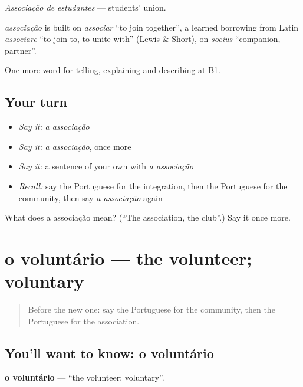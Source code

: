 \emph{Associação de estudantes} — students' union.

\begin{cousinweb}
\emph{associação} is built on \emph{associar} \textquotedblleft{}to join together\textquotedblright{}, a learned borrowing from Latin \emph{associāre} \textquotedblleft{}to join to, to unite with\textquotedblright{} (Lewis \& Short), on \emph{socius} \textquotedblleft{}companion, partner\textquotedblright{}.
\end{cousinweb}

\begin{grammarlens}[title={What you've built}]
One more word for telling, explaining and describing at B1.
\end{grammarlens}

\subsection*{Your turn}
\begin{itemize}
\raggedright
  \item \emph{Say it:} \emph{a associação}
  \item \emph{Say it:} \emph{a associação}, once more
  \item \emph{Say it:} a sentence of your own with \emph{a associação}
  \item \emph{Recall:} say the Portuguese for the integration, then the Portuguese for the community, then say \emph{a associação} again
\end{itemize}

\begin{tcolorbox}[breakable,colback=teal!4,colframe=teal!35!black,title={Before you move on}]
What does a associação mean? (\textquotedblleft{}The association, the club\textquotedblright{}.) Say it once more.
\end{tcolorbox}
\section[o voluntário]{o voluntário — the volunteer; voluntary}

\label{lesson:PT-C367-voluntario}



\begin{quote}
Before the new one: say the Portuguese for the community, then the Portuguese for the association.
\end{quote}

\subsection*{You'll want to know: o voluntário}
\textbf{o voluntário} — \textquotedblleft{}the volunteer; voluntary\textquotedblright{}.

